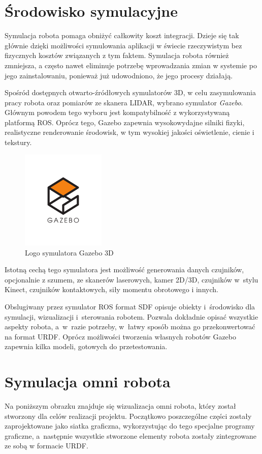 \section{Środowisko symulacyjne}
Symulacja robota pomaga obniżyć całkowity koszt integracji. Dzieje się tak
głównie dzięki możliwości symulowania aplikacji w świecie rzeczywistym bez
fizycznych kosztów związanych z tym faktem. Symulacja robota również zmniejsza,
a często nawet eliminuje potrzebę wprowadzania zmian w systemie po jego
zainstalowaniu, ponieważ już udowodniono, że jego procesy działają.

Spośród dostępnych otwarto-źródłowych symulatorów 3D, w celu zasymulowania 
pracy robota oraz pomiarów ze skanera LIDAR, wybrano symulator \textit{Gazebo}.
Głównym powodem tego wyboru jest kompatybilność z wykorzystywaną platformą ROS.
Oprócz tego, Gazebo zapewnia wysokowydajne silniki fizyki, realistyczne
renderowanie środowisk, w tym wysokiej jakości oświetlenie, cienie i tekstury.

\begin{figure}
  \centering
  \includegraphics[width=40mm]{graphics/gazebologo.png}
  \caption{Logo symulatora Gazebo 3D}
  \label{fig:gazebologo}
\end{figure}

Istotną cechą tego symulatora jest możliwość generowania danych czujników,
opcjonalnie z szumem, ze skanerów laserowych, kamer 2D/3D, czujników w~stylu
Kinect, czujników kontaktowych, siły momentu obrotowego i innych.

Obslugiwany przez symulator ROS format SDF opisuje obiekty i~środowisko dla
symulacji, wizualizacji i~sterowania robotem.
Pozwala dokładnie opisać
wszystkie aspekty robota, a~w~razie potrzeby, w~łatwy sposób można go
przekonwertować na format URDF.
Oprócz możliwości tworzenia własnych robotów Gazebo zapewnia kilka modeli,
gotowych do przetestowania.

\section{Symulacja omni robota}
Na poniższym obrazku znajduje się wizualizacja omni robota, który został
stworzony dla celów realizacji projektu.
Początkowo poszczególne części
zostały zaprojektowane jako siatka graficzna, wykorzystując do tego specjalne
programy graficzne, a~następnie wszystkie stworzone elementy robota zostały
zintegrowane ze sobą w formacie URDF.

